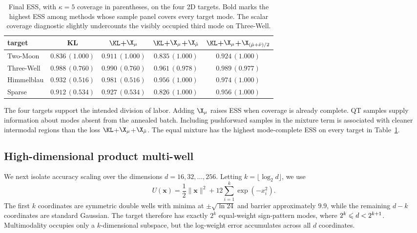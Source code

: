 \documentclass{article}
\begin{document}
\begin{table}[htb]
    \centering
    \begin{tabular}{lcccc}
        \toprule
        target & KL & $\KL$+$\X_\mu$ & $\KL$+$\X_\mu$+$\X_{\hat\mu}$ & $\KL$+$\X_\mu$+$\X_{(\hat\mu+\bar\nu)/2}$ \\
        \midrule
        Two-Moon   & $0.836\,(1.000)$ & $0.911\,(1.000)$ & $0.835\,(1.000)$ & $\mathbf{0.924}\,(1.000)$ \\
        Three-Well & $0.988\,(0.760)$ & $0.990\,(0.760)$ & $0.961\,(0.978)$ & $\mathbf{0.989}\,(0.977)$ \\
        Himmelblau & $0.932\,(0.516)$ & $0.981\,(0.516)$ & $0.956\,(1.000)$ & $\mathbf{0.974}\,(1.000)$ \\
        Sparse     & $0.912\,(0.534)$ & $0.927\,(0.534)$ & $0.826\,(1.000)$ & $\mathbf{0.956}\,(1.000)$ \\
        \bottomrule
    \end{tabular}
    \caption{Final ESS, with $\kappa=5$ coverage in parentheses, on the four 2D targets. Bold marks the highest ESS among methods whose sample panel covers every target mode. The scalar coverage diagnostic slightly undercounts the visibly occupied third mode on Three-Well.}
    \label{tab: 2d-benchmark-summary}
\end{table}

The four targets support the intended division of labor. Adding $\X_\mu$ raises ESS when coverage is already complete. QT samples supply information about modes absent from the annealed batch. Including pushforward samples in the mixture term is associated with cleaner intermodal regions than the loss $\KL$+$\X_\mu$+$\X_{\hat\mu}$. The equal mixture has the highest mode-complete ESS on every target in Table~\ref{tab: 2d-benchmark-summary}.

\subsection{High-dimensional product multi-well}
\label{subsec: highd}

We next isolate accuracy scaling over the dimensions
$d=16,32,\ldots,256$. Letting $k=\lfloor\log_2 d\rfloor$, we use
\begin{equation}
    U(\mathbf{x})=\frac12\lVert\mathbf{x}\rVert^2
    +12\sum_{i=1}^{k}\exp(-x_i^2).
    \label{eq: highd-potential}
\end{equation}
The first $k$ coordinates are symmetric double wells with minima at $\pm\sqrt{\ln 24}$ and barrier approximately $9.9$, while the remaining $d-k$ coordinates are standard Gaussian. The target therefore has exactly $2^k$ equal-weight sign-pattern modes, where $2^k\leqslant d<2^{k+1}$. Multimodality occupies only a $k$-dimensional subspace, but the log-weight error accumulates across all $d$ coordinates.
\end{document}
